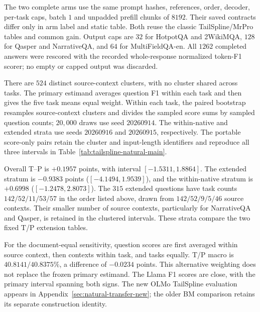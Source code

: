 The two complete arms use the same prompt hashes, references, order, decoder,
per-task caps, batch $1$ and unpadded prefill chunks of $8192$. Their saved
contracts differ only in arm label and static table. Both reuse the classic
TailSpline/MrPro tables and common gain. Output caps are $32$ for HotpotQA and
2WikiMQA, $128$ for Qasper and NarrativeQA, and $64$ for MultiFieldQA-en.
All $1262$ completed answers were rescored with the recorded whole-response
normalized token-F1 scorer; no empty or capped output was discarded.

There are $524$ distinct source-context clusters, with no cluster shared across
tasks. The primary estimand averages question F1 within each task and then gives
the five task means equal weight. Within each task, the paired bootstrap
resamples source-context clusters and divides the sampled score sums by sampled
question counts; $20{,}000$ draws use seed $20260914$. The within-native and
extended strata use seeds $20260916$ and $20260915$, respectively. The portable
score-only pairs retain the cluster and input-length identifiers and reproduce
all three intervals in Table~\ref{tab:tailspline-natural-main}.




Overall T--P is $+0.1957$ points, with interval $[-1.5311,1.8864]$.
The extended stratum is $-0.9383$ points ($[-4.1494,1.9539]$), and the within-native
stratum is $+0.6998$ ($[-1.2478,2.8073]$). The $315$ extended questions have task
counts $142/52/11/53/57$ in the order listed above, drawn from
$142/52/9/5/46$ source contexts. Their smaller number of source contexts,
particularly for NarrativeQA and Qasper, is retained in the clustered intervals.
These strata compare the two fixed T/P extension tables.

For the document-equal sensitivity, question scores are first averaged within
source context, then contexts within task, and tasks equally. T/P macro is
$40.8141/40.8375\%$, a difference of $-0.0234$ points. This alternative weighting
does not replace the frozen primary estimand. The Llama F1 scores are close, with the primary interval spanning both
signs. The new OLMo TailSpline evaluation appears in
Appendix~\ref{sec:natural-transfer-new}; the older BM comparison retains its
separate construction identity.

